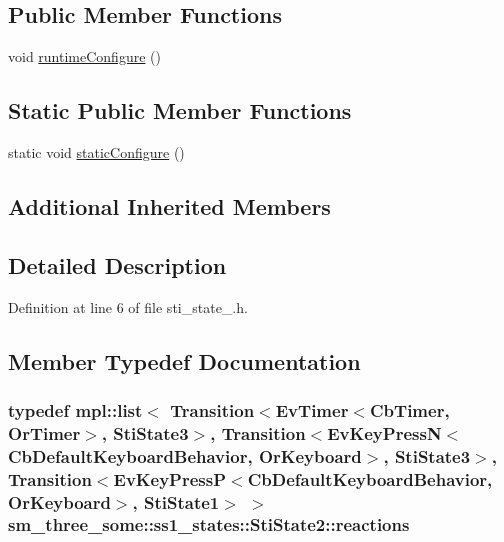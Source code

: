 \subsection*{Public Member Functions}
\begin{DoxyCompactItemize}
\item 
void \hyperlink{structsm__three__some_1_1ss1__states_1_1StiState2_ad106d6241b8c5106f0bce5292c7af09a}{runtime\+Configure} ()
\end{DoxyCompactItemize}
\subsection*{Static Public Member Functions}
\begin{DoxyCompactItemize}
\item 
static void \hyperlink{structsm__three__some_1_1ss1__states_1_1StiState2_ae3565c400d5fe4023e67b6825a168464}{static\+Configure} ()
\end{DoxyCompactItemize}
\subsection*{Additional Inherited Members}


\subsection{Detailed Description}


Definition at line 6 of file sti\+\_\+state\+\_.\+h.



\subsection{Member Typedef Documentation}
\subsubsection[{\texorpdfstring{reactions}{reactions}}]{\setlength{\rightskip}{0pt plus 5cm}typedef mpl\+::list$<$ Transition$<$Ev\+Timer$<$Cb\+Timer, {\bf Or\+Timer}$>$, {\bf Sti\+State3}$>$, Transition$<$Ev\+Key\+PressN$<$Cb\+Default\+Keyboard\+Behavior, {\bf Or\+Keyboard}$>$, {\bf Sti\+State3}$>$, Transition$<$Ev\+Key\+PressP$<$Cb\+Default\+Keyboard\+Behavior, {\bf Or\+Keyboard}$>$, {\bf Sti\+State1}$>$ $>$ {\bf sm\+\_\+three\+\_\+some\+::ss1\+\_\+states\+::\+Sti\+State2\+::reactions}}\hypertarget{structsm__three__some_1_1ss1__states_1_1StiState2_a3a6dd1b1f9cf7033bbb6e0c6bbc76f5c}{}\label{structsm__three__some_1_1ss1__states_1_1StiState2_a3a6dd1b1f9cf7033bbb6e0c6bbc76f5c}


